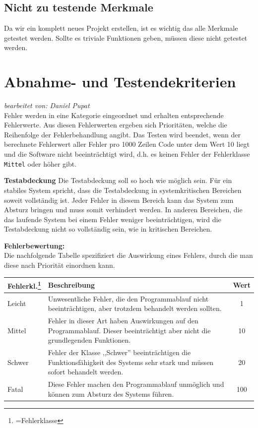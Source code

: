 \documentclass[fontsize=12pt,paper=a4,twoside]{scrartcl}
\begin{document}
\subsection{Nicht zu testende Merkmale}\label{c05}
Da wir ein komplett neues Projekt erstellen, ist es wichtig das alle Merkmale getestet werden. Sollte es triviale Funktionen geben, müssen diese nicht getestet werden.

\section{Abnahme- und Testendekriterien}\label{c07}
\textit{bearbeitet von: Daniel Pupat }\\

Fehler werden in eine Kategorie eingeordnet und erhalten entsprechende Fehlerwerte. Aus diesen Fehlerwerten ergeben sich Prioritäten, welche die Reihenfolge der Fehlerbehandlung angibt. Das Testen wird beendet, wenn der berechnete Fehlerwert aller Fehler pro 1000 Zeilen Code unter dem Wert 10 liegt und die Software nicht beeinträchtigt wird, d.h. es keinen Fehler der Fehlerklasse \texttt{Mittel} oder höher gibt.

\textbf{Testabdeckung}
Die Testabdeckung soll so hoch wie möglich sein. Für ein stabiles System spricht, dass die Testabdeckung in systemkritischen Bereichen soweit vollständig ist. Jeder Fehler in diesem Bereich kann das System zum Absturz bringen und muss somit verhindert werden. In anderen Bereichen, die das laufende System bei einem Fehler weniger beeinträchtigen, wird die Testabdeckung nicht so vollständig sein, wie in kritischen Bereichen.

\textbf{Fehlerbewertung:}\\
Die nachfolgende Tabelle spezifiziert die Auswirkung eines Fehlers, durch die man diese nach Priorität einordnen kann.\\

\begin{tabularx}{\textwidth}{|p{2cm}|p{11.53cm}|c|}
\hline
	\textbf{Fehlerkl.\footnote{=Fehlerklasse}} & \textbf{Beschreibung} & \textbf{Wert}\\
\hline
	Leicht & Unwesentliche Fehler, die den Programmablauf nicht beeinträchtigen, aber trotzdem behandelt werden sollten. & 1\\
\hline
	Mittel & Fehler in dieser Art haben Auswirkungen auf den Programmablauf. Dieser beeinträchtigt aber nicht die grundlegenden Funktionen. & 10\\
\hline
	Schwer & Fehler der Klasse ,,Schwer'' beeinträchtigen die Funktionsfähigkeit des Systems sehr stark und müssen sofort behandelt werden. & 20\\
\hline
	Fatal & Diese Fehler machen den Programmablauf unmöglich und können zum Absturz des Systems führen.  & 100\\
\hline
\end{tabularx}
\end{document}
